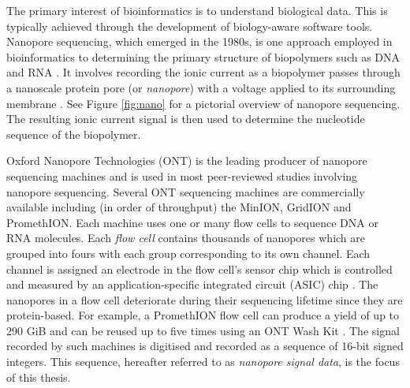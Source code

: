 The primary interest of bioinformatics is to understand biological data. This is
typically achieved through the development of biology-aware software tools.
Nanopore sequencing, which emerged in the 1980s, is one approach employed in
bioinformatics to determining the primary structure of biopolymers such as DNA
and RNA \cite{three-decades-nano}. It involves recording the ionic current as a
biopolymer passes through a nanoscale protein pore (or \textit{nanopore}) with a
voltage applied to its surrounding membrane \cite{Wang2021}. See Figure
\ref{fig:nano} for a pictorial overview of nanopore sequencing. The resulting
ionic current signal is then used to determine the nucleotide sequence of the
biopolymer.

Oxford Nanopore Technologies (ONT) is the leading producer of
nanopore sequencing machines and is used in most peer-reviewed studies involving
nanopore sequencing. Several ONT sequencing machines are commercially available
including (in order of throughput) the MinION, GridION and PromethION.
Each machine uses one or many flow cells to sequence DNA or RNA molecules. Each
\textit{flow cell} contains thousands of nanopores which are grouped into fours
with each group corresponding to its own channel. Each channel is assigned an
electrode in the flow cell's sensor chip which is controlled and measured by an
application-specific integrated circuit (ASIC) chip \cite{Wang2021}. The nanopores in a flow
cell deteriorate during their sequencing lifetime since they are protein-based.
For example, a PromethION flow cell can produce a yield of up to 290 GiB and can
be reused up to five times using an ONT Wash Kit \cite{nano-web}.
The signal recorded by such machines is digitised and recorded as a sequence of
16-bit signed integers. This sequence, hereafter referred to as \textit{nanopore
signal data}, is the focus of this thesis.


